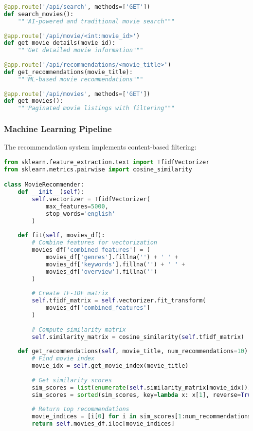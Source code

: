 \documentclass[12pt,a4paper]{article}
\begin{document}
\begin{lstlisting}[language=Python, caption=Core API Endpoints]
@app.route('/api/search', methods=['GET'])
def search_movies():
    """AI-powered and traditional movie search"""
    
@app.route('/api/movie/<int:movie_id>')
def get_movie_details(movie_id):
    """Get detailed movie information"""
    
@app.route('/api/recommendations/<movie_title>')
def get_recommendations(movie_title):
    """ML-based movie recommendations"""
    
@app.route('/api/movies', methods=['GET'])
def get_movies():
    """Paginated movie listings with filtering"""
\end{lstlisting}

\subsubsection{Machine Learning Pipeline}
The recommendation system implements content-based filtering:

\begin{lstlisting}[language=Python, caption=Recommendation Algorithm]
from sklearn.feature_extraction.text import TfidfVectorizer
from sklearn.metrics.pairwise import cosine_similarity

class MovieRecommender:
    def __init__(self):
        self.vectorizer = TfidfVectorizer(
            max_features=5000,
            stop_words='english'
        )
        
    def fit(self, movies_df):
        # Combine features for vectorization
        movies_df['combined_features'] = (
            movies_df['genres'].fillna('') + ' ' +
            movies_df['keywords'].fillna('') + ' ' +
            movies_df['overview'].fillna('')
        )
        
        # Create TF-IDF matrix
        self.tfidf_matrix = self.vectorizer.fit_transform(
            movies_df['combined_features']
        )
        
        # Compute similarity matrix
        self.similarity_matrix = cosine_similarity(self.tfidf_matrix)
        
    def get_recommendations(self, movie_title, num_recommendations=10):
        # Find movie index
        movie_idx = self.get_movie_index(movie_title)
        
        # Get similarity scores
        sim_scores = list(enumerate(self.similarity_matrix[movie_idx]))
        sim_scores = sorted(sim_scores, key=lambda x: x[1], reverse=True)
        
        # Return top recommendations
        movie_indices = [i[0] for i in sim_scores[1:num_recommendations+1]]
        return self.movies_df.iloc[movie_indices]
\end{lstlisting}
\end{document}
